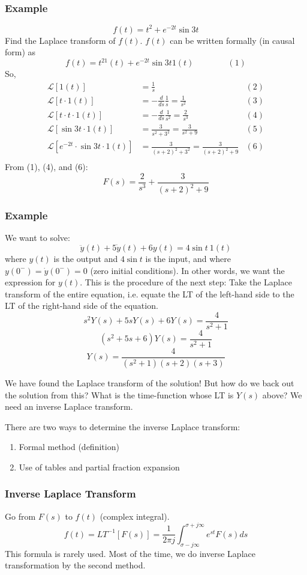 \documentclass{book}
\newcommand{\LT}{\mathcal{L}}
\newcommand{\exmp}{\subsubsection*{Example}}
\begin{document}
\exmp
\[ f(t) = t^2+e^{-2t}\sin3t \]
Find the Laplace transform of $ f(t) $. $ f(t) $ can be written formally (in causal form) as
\[ f(t) = t^21(t)+e^{-2t}\sin3t1(t) \qquad\qquad(1) \]
So,
\begin{align*}
\LT[1(t)]&=\frac{1}{s}&(2)\\
\LT[t\cdot 1(t)]&=-\frac{d}{ds}\frac{1}{s}=\frac{1}{s^2}&(3)\\
\LT[t\cdot t\cdot 1(t)]&=-\frac{d}{ds}\frac{1}{s^2}=\frac{2}{s^3}&(4)\\
\LT[\sin 3t\cdot 1(t)]&=\frac{3}{s^2+3^2}=\frac{3}{s^2+9}&(5)\\
\LT[e^{-2t}\cdot\sin 3t\cdot 1(t)]&=\frac{3}{(s+2)^2+3^2}=\frac{3}{(s+2)^2+9}&(6)\\
\end{align*}
From (1), (4), and (6):
\[ F(s) = \frac{2}{s^3} + \frac{3}{(s+2)^2+9} \]


\exmp
We want to solve: 
\[ \ddot{y}(t) + 5\dot{y}(t) + 6y(t) = 4\sin t\ 1(t) \]
where $ y(t) $ is the output and $ 4\sin t $ is the input, and where $ y(0^-)=\dot{y}(0^-) = 0 $ (zero initial conditions). In other words, we want the expression for $ y(t) $. This is the procedure of the next step: Take the Laplace transform of the entire equation, i.e. equate the LT of the left-hand side to the LT of the right-hand side of the equation. 
\[ s^2Y(s)+5sY(s)+6Y(s)=\frac{4}{s^2+1} \]
\[ (s^2+5s+6)Y(s)=\frac{4}{s^2+1} \]
\[ \boxed{Y(s) = \frac{4}{(s^2+1)(s+2)(s+3)}} \]

We have found the Laplace transform of the solution! But how do we back out the solution from this? What is the time-function whose LT is $ Y(s) $ above? We need an inverse Laplace transform.

There are two ways to determine the inverse Laplace transform:
\begin{enumerate}
	\item Formal method (definition)
	\item Use of tables and partial fraction expansion
\end{enumerate}

\subsubsection*{Inverse Laplace Transform}
Go from $ F(s) $ to $ f(t) $ (complex integral).
\[ f(t)=LT^{-1}[F(s)] = \frac{1}{2\pi j}\int_{\sigma-j\infty}^{\sigma+j\infty} e^{st}F(s) ds \]
This formula is rarely used. Most of the time, we do inverse Laplace transformation by the second method.
\end{document}
